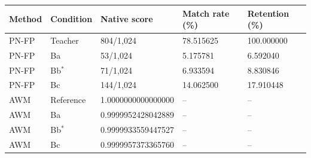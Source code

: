 \begin{tabular}{lllll}
\toprule
Method & Condition & Native score & Match rate (\%) & Retention (\%) \\
\midrule
PN-FP & Teacher & 804/1,024 & 78.515625 & 100.000000 \\
PN-FP & Ba & 53/1,024 & 5.175781 & 6.592040 \\
PN-FP & Bb$^\ast$ & 71/1,024 & 6.933594 & 8.830846 \\
PN-FP & Bc & 144/1,024 & 14.062500 & 17.910448 \\
AWM & Reference & 1.0000000000000000 & -- & -- \\
AWM & Ba & 0.9999952428042889 & -- & -- \\
AWM & Bb$^\ast$ & 0.9999933559447527 & -- & -- \\
AWM & Bc & 0.9999957373365760 & -- & -- \\
\bottomrule
\end{tabular}
